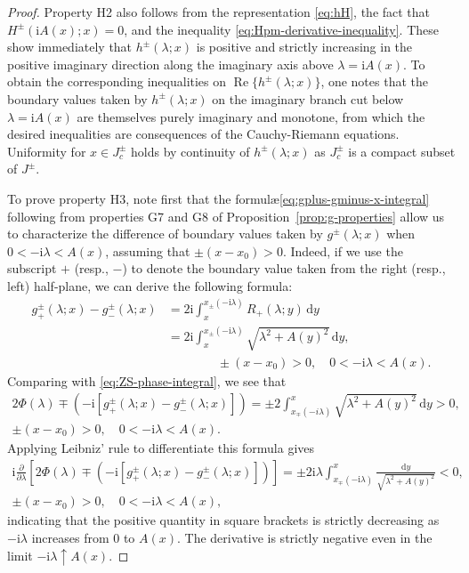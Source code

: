 \documentclass[12pt]{amsart}
\numberwithin{equation}{section}
\newcommand{\dd}{\mathrm{d}}
\newcommand{\ii}{\mathrm{i}}
\newcommand{\SP}{\lambda}
\newcommand{\phaseint}{\Phi}
\DeclareMathOperator{\re}{Re}
\begin{document}
\begin{proof}
Property H2 also follows from the representation \eqref{eq:hH}, the fact that $H^\pm(\ii A(x);x)=0$, and the inequality \eqref{eq:Hpm-derivative-inequality}.  These show immediately that $h^\pm(\SP;x)$ is positive and strictly increasing in the positive imaginary direction along the imaginary axis above $\SP=\ii A(x)$.  To obtain the corresponding inequalities on $\re\{h^\pm(\SP;x)\}$, one notes that the boundary values taken by $h^\pm(\SP;x)$ on the imaginary branch cut below $\SP=\ii A(x)$ are themselves purely imaginary and monotone, from which the desired inequalities are consequences of the Cauchy-Riemann equations.  Uniformity for $x\in J_c^\pm$ holds by continuity of $h^\pm(\SP;x)$ as $J_c^\pm$ is a compact subset of $J^\pm$.

To prove property H3, note first that the formul\ae \eqref{eq:gplus-gminus-x-integral} following from properties G7 and G8 of Proposition~\ref{prop:g-properties} allow us to characterize the difference of boundary values taken by $g^\pm(\SP;x)$ when $0<-\ii \SP<A(x)$, assuming that $\pm (x-x_0)>0$.  Indeed, if we use the subscript $+$ (resp., $-$) to denote the boundary value taken from the right (resp., left) half-plane, we can derive the following formula:
\begin{equation}
\begin{split}
g^\pm_+(\SP;x)-g^\pm_-(\SP;x)&=2\ii\int_x^{x_\pm(-\ii\SP)}R_+(\SP;y)\,\dd y \\ &= 2\ii\int_x^{x_\pm(-\ii\SP)}\sqrt{\SP^2+A(y)^2}\,\dd y,\\ &\qquad\qquad \pm (x-x_0)>0,\quad 0<-\ii\SP<A(x).
\end{split}
\end{equation}
Comparing with \eqref{eq:ZS-phase-integral}, we see that
\begin{multline}
2\phaseint(\SP)\mp\left(-\ii[g^\pm_+(\SP;x)-g^\pm_-(\SP;x)]\right)=\pm 2\int_{x_\mp(-i\SP)}^x\sqrt{\SP^2+A(y)^2}\,\dd y >0,\\ \pm (x-x_0)>0,\quad 0<-\ii\SP<A(x).
\end{multline}
Applying Leibniz' rule to differentiate this formula gives
\begin{multline}
\ii\frac{\partial}{\partial\SP}\left[2\phaseint(\SP)\mp\left(-\ii[g^\pm_+(\SP;x)-g^\pm_-(\SP;x)]\right)
\right]
= \pm 2\ii\SP\int_{x_\mp(-\ii\SP)}^x\frac{\dd y}{\sqrt{\SP^2+A(y)^2}}<0,\\ \pm (x-x_0)>0,\quad 0<-\ii\SP<A(x),
\label{eq:gdiff-derivative-inequality}
\end{multline}
indicating that the positive quantity in square brackets is strictly decreasing as $-\ii\SP$ increases from $0$ to $A(x)$.  The derivative is strictly negative even in the limit $-\ii\SP\uparrow A(x)$.


\end{proof}
\end{document}
